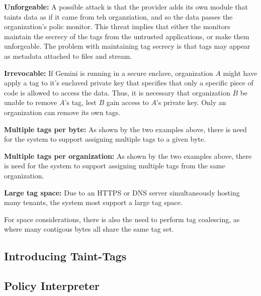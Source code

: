 \begin{widelist}
\item \textbf{Unforgeable:}
    A possible attack is that the provider adds its own module that taints data as
    if it came from teh organziation, and so the data passes the organization's
    polic monitor.
    This threat implies that either the monitors maintain the secrecy of the tags
    from the untrusted applications, or make them unforgeable.
    The problem with maintaining tag secrecy is that tags may appear as metadata
    attached to files and stream.

\item \textbf{Irrevocable:}
    If Gemini is running in a secure enclave, organization $A$ might have apply
    a tag to it's enclaved private key that specifies that only a specific
    piece of code is allowed to access the data.
    Thus, it is necessary that organization $B$ be unable to remove $A$'s tag,
    lest $B$ gain access to $A$'s private key.
    Only an organization can remove its own tags.

\item \textbf{Multiple tags per byte:}
    As shown by the two examples above, there is need for the system to support
    assigning multiple tags to a given byte.

\item \textbf{Multiple tags per organization:}
    As shown by the two examples above, there is need for the system to support
    assigning multiple tags from the same organization.

\item \textbf{Large tag space:}
    Due to an HTTPS or DNS server simultaneously hosting many tenants, the
    system most support a large tag space.
\end{widelist}

For space considerations, there is also the need to perform tag coalescing, as where
many contigous bytes all share the same tag set.


\subsection{Introducing Taint-Tags}



\subsection{Policy Interpreter}

